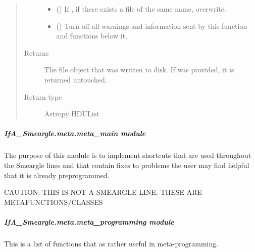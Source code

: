 \documentclass[letterpaper,10pt,english]{sphinxmanual}
\begin{document}
\begin{fulllineitems}
\begin{quote}
\begin{description}
\begin{itemize}
\item {} 
 (\sphinxstyleliteralemphasis{\sphinxupquote{ (}}\sphinxstyleliteralemphasis{\sphinxupquote{)}}) \textendash{} If , if there exists a file of the same name, overwrite.

\item {} 
 (\sphinxstyleliteralemphasis{\sphinxupquote{ (}}\sphinxstyleliteralemphasis{\sphinxupquote{)}}) \textendash{} Turn off all warnings and information sent by this function and
functions below it.

\end{itemize}

\item[{Returns}] \leavevmode
{} \textendash{} The file object that was written to disk. If  was
provided, it is returned untouched.

\item[{Return type}] \leavevmode
Astropy HDUList

\end{description}\end{quote}

\end{fulllineitems}



\subparagraph{IfA\_Smeargle.meta.meta\_main module}
\label{\detokenize{python_docstrings/IfA_Smeargle.meta.meta_main:module-IfA_Smeargle.meta.meta_main}}\label{\detokenize{python_docstrings/IfA_Smeargle.meta.meta_main:ifa-smeargle-meta-meta-main-module}}\label{\detokenize{python_docstrings/IfA_Smeargle.meta.meta_main::doc}}
The purpose of this module is to implement shortcuts that are used throughout the Smeargle
lines and that contain fixes to problems the user may find helpful that it is already
preprogrammed.

CAUTION: THIS IS NOT A SMEARGLE LINE. THESE ARE METAFUNCTIONS/CLASSES


\subparagraph{IfA\_Smeargle.meta.meta\_programming module}
\label{\detokenize{python_docstrings/IfA_Smeargle.meta.meta_programming:module-IfA_Smeargle.meta.meta_programming}}\label{\detokenize{python_docstrings/IfA_Smeargle.meta.meta_programming:ifa-smeargle-meta-meta-programming-module}}\label{\detokenize{python_docstrings/IfA_Smeargle.meta.meta_programming::doc}}
This is a list of functions that as rather useful in meta-programming.
\end{document}
